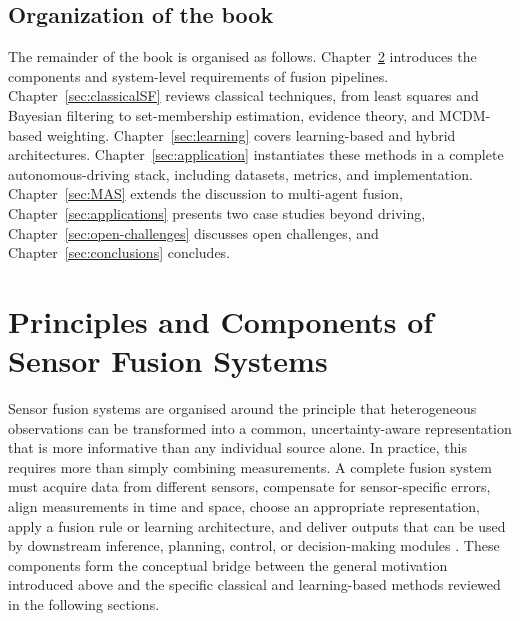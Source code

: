 \documentclass[11pt,oneside,openany]{book}
\newcommand{\TC}[1]{\textcolor{cyan}{#1}}
\begin{document}
\section{Organization of the book}

The remainder of the book is organised as follows. Chapter~\ref{sec:Principles} introduces the components and system-level requirements of fusion pipelines. Chapter~\ref{sec:classicalSF} reviews classical techniques, from least squares and Bayesian filtering to set-membership estimation, evidence theory, and MCDM-based weighting. Chapter~\ref{sec:learning} covers learning-based and hybrid architectures. Chapter~\ref{sec:application} instantiates these methods in a complete autonomous-driving stack, including datasets, metrics, and implementation. Chapter~\ref{sec:MAS} extends the discussion to multi-agent fusion, Chapter~\ref{sec:applications} presents two case studies beyond driving, Chapter~\ref{sec:open-challenges} discusses open challenges, and Chapter~\ref{sec:conclusions} concludes.

%
%
\chapter{Principles and Components of Sensor Fusion Systems}
\label{sec:Principles}
%
%


Sensor fusion systems are organised around the principle that heterogeneous observations can be transformed into a common, uncertainty-aware representation that is more informative than any individual source alone. In practice, this requires more than simply combining measurements. A complete fusion system must acquire data from different sensors, compensate for sensor-specific errors, align measurements in time and space, choose an appropriate representation, apply a fusion rule or learning architecture, and deliver outputs that can be used by downstream inference, planning, control, or decision-making modules \cite{hall_introduction_1997,luo_multisensor_1989,liggins_handbook_2009,khaleghi_multisensor_2013}. These components form the conceptual bridge between the general motivation introduced above and the specific classical and learning-based methods reviewed in the following sections.
\end{document}
